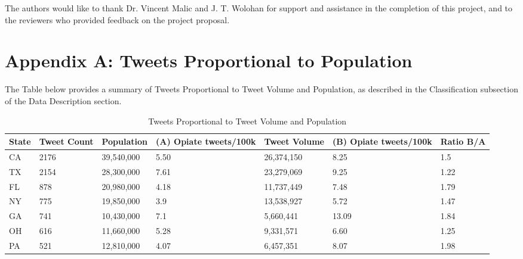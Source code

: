 \documentclass[sigconf]{acmart}
\begin{document}
\begin{acks}
  The authors would like to thank Dr. Vincent Malic and J. T. Wolohan 
  for support and assistance in the completion of this project, and to 
  the reviewers who provided feedback on the project proposal.
\end{acks}


 


\appendix

\section{Appendix A: Tweets Proportional to Population}
The Table below provides a summary of Tweets Proportional to Tweet 
Volume and Population, as described in the Classification subsection of 
the Data Description section.

\begin{table}[ht]
\centering
\caption{Tweets Proportional to Tweet Volume and Population}
\label{tab:1}
  \begin{tabular}{lllllll}
    \toprule
    State & Tweet Count & Population & (A) Opiate tweets/100k & Tweet Volume & 
    (B) Opiate tweets/100k & Ratio B/A \\
    \midrule     
    CA& 2176& 39,540,000& 5.50& 26,374,150& 8.25& 1.5 \\
    TX& 2154& 28,300,000& 7.61& 23,279,069& 9.25& 1.22 \\
    FL& 878& 20,980,000& 4.18& 11,737,449& 7.48& 1.79 \\
    NY& 775& 19,850,000& 3.9& 13,538,927& 5.72& 1.47 \\
    GA& 741& 10,430,000& 7.1& 5,660,441& 13.09& 1.84 \\
    OH& 616& 11,660,000& 5.28& 9,331,571& 6.60 & 1.25 \\
    PA& 521& 12,810,000& 4.07& 6,457,351& 8.07& 1.98 \\	
    \bottomrule
  \end{tabular}
\end{table}





%
\end{document}
